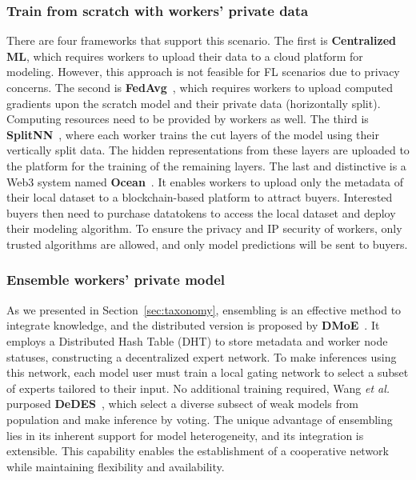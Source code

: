 \subsubsection{Train from scratch with workers' private data}
There are four frameworks that support this scenario. 
The first is \textbf{Centralized ML}, which requires workers to upload their data to a cloud platform for modeling. However, this approach is not feasible for FL scenarios due to privacy concerns. 
The second is \textbf{FedAvg}~\cite{mcmahan2017communication}, which requires workers to upload computed gradients upon the scratch model and their private data (horizontally split). Computing resources need to be provided by workers as well.
The third is \textbf{SplitNN}~\cite{vepakomma2019split}, where each worker trains the cut layers of the model using their vertically split data. 
The hidden representations from these layers are uploaded to the platform for the training of the remaining layers.
The last and distinctive is a Web3 system named \textbf{Ocean}~\cite{mcconaghy2022ocean}.
It enables workers to upload only the metadata of their local dataset to a blockchain-based platform to attract buyers. 
Interested buyers then need to purchase datatokens to access the local dataset and deploy their modeling algorithm. 
To ensure the privacy and IP security of workers, only trusted algorithms are allowed, and only model predictions will be sent to buyers.

\subsubsection{Ensemble workers' private model} %
As we presented in Section~\ref{sec:taxonomy}, ensembling is an effective method to integrate knowledge, and the distributed version is proposed by \textbf{DMoE}~\cite{ryabinin2020towards}. 
It employs a Distributed Hash Table (DHT) to store metadata and worker node statuses, constructing a decentralized expert network. 
To make inferences using this network, each model user must train a local gating network to select a subset of experts tailored to their input.
No additional training required, Wang \textit{et al.} purposed \textbf{DeDES}~\cite{wang2023data}, which select a diverse subsect of weak models from population and make inference by voting. 
The unique advantage of ensembling lies in its inherent support for model heterogeneity, and its integration is extensible. 
This capability enables the establishment of a cooperative network while maintaining flexibility and availability.


